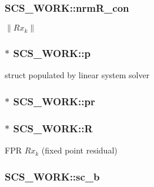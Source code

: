 \hypertarget{struct_s_c_s___w_o_r_k_a181c42e5bc2993d210af0e8583ebc619}{
\subsubsection[{nrm\-R\-\_\-con}]{ S\-C\-S\-\_\-\-W\-O\-R\-K\-::nrm\-R\-\_\-con}}\label{struct_s_c_s___w_o_r_k_a181c42e5bc2993d210af0e8583ebc619}
$\|Rx_k\|$ \hypertarget{struct_s_c_s___w_o_r_k_a2421f797d8a128d6a0261be319a5f5db}{
\subsubsection[{p}]{$\ast$ S\-C\-S\-\_\-\-W\-O\-R\-K\-::p}}\label{struct_s_c_s___w_o_r_k_a2421f797d8a128d6a0261be319a5f5db}
struct populated by linear system solver \hypertarget{struct_s_c_s___w_o_r_k_a84cf8506c84d35cb16f7e61bc069d397}{
\subsubsection[{pr}]{$\ast$ S\-C\-S\-\_\-\-W\-O\-R\-K\-::pr}}\label{struct_s_c_s___w_o_r_k_a84cf8506c84d35cb16f7e61bc069d397}
\hypertarget{struct_s_c_s___w_o_r_k_a599d46f1e9537cbf96bc6f1cf671ffc7}{
\subsubsection[{R}]{$\ast$ S\-C\-S\-\_\-\-W\-O\-R\-K\-::\-R}}\label{struct_s_c_s___w_o_r_k_a599d46f1e9537cbf96bc6f1cf671ffc7}
F\-P\-R $Rx_k$ (fixed point residual) \hypertarget{struct_s_c_s___w_o_r_k_a00e156d74af3a51c8225907fed29a4a3}{
\subsubsection[{sc\-\_\-b}]{ S\-C\-S\-\_\-\-W\-O\-R\-K\-::sc\-\_\-b}}\label{struct_s_c_s___w_o_r_k_a00e156d74af3a51c8225907fed29a4a3}
